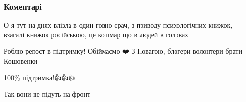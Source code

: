  
 
 
 
 
\subsubsection{Коментарі}

\begin{itemize}
 
О я тут на днях влізла в один говно срач, з приводу психологічних книжок, взагалі книжок російською, це кошмар що в людей в головах 😤

 
Роблю репост в підтримку! Обіймаємо ❤️ З Повагою, блогери-волонтери брати Кошовенки 🔱🇺🇦

 
100\% підтримка!👍👍👍

 
Так вони не підуть на фронт

 


\end{itemize}
